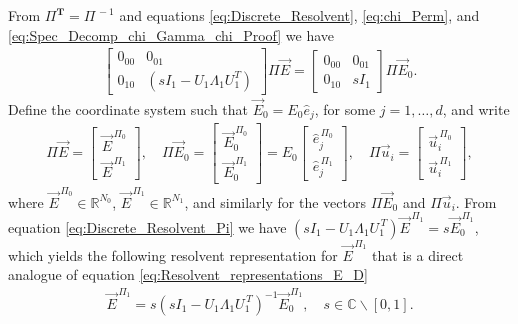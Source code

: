 \documentclass{cmslatex}
\newcommand{\T}{\mathbf{T}}
\begin{document}
From $\Pi^{\T}=\Pi^{\,-1}$ and equations \eqref{eq:Discrete_Resolvent},
\eqref{eq:chi_Perm}, and \eqref{eq:Spec_Decomp_chi_Gamma_chi_Proof} we
have 
%
\begin{align}\label{eq:Discrete_Resolvent_Pi}
  \left[
  \begin{array}{ccc}
    0_{00}&0_{01}\\
    0_{10}&(sI_1-U_1\Lambda_1U_1^T)
    \end{array}
\right]
\Pi\vec{E}
=
\left[
  \begin{array}{ccc}
    0_{00}&0_{01}\\
    0_{10}&sI_1
    \end{array}
\right]
\Pi\vec{E}_0.
\end{align}
%
Define the coordinate system such that $\vec{E}_0=E_0\hat{e}_j$, for
some $j=1,\ldots,d$, and write 
%
\begin{align}\label{Pi_coordinates_E}
  \Pi\vec{E}=
  \left[
  \begin{array}{ccc}
    \vec{E}^{\,\Pi_0}\\
    \vec{E}^{\,\Pi_1}
    \end{array}
\right],
\quad
 \Pi\vec{E}_0=
  \left[
  \begin{array}{ccc}
    \vec{E}_0^{\,\Pi_0}\\
    \vec{E}_0^{\,\Pi_1}
    \end{array}
\right]
=
E_0
\left[
  \begin{array}{ccc}
    \hat{e}_j^{\,\Pi_0}\\
    \hat{e}_j^{\,\Pi_1}
    \end{array}
\right],
\quad
 \Pi\vec{u}_i=
  \left[
  \begin{array}{ccc}
    \vec{u}_i^{\,\Pi_0}\\
    \vec{u}_i^{\,\Pi_1}
    \end{array}
\right],
\end{align}
%
where $\vec{E}^{\,\Pi_0}\in\mathbb{R}^{N_0}$,
$\vec{E}^{\,\Pi_1}\in\mathbb{R}^{N_1}$, and similarly for the vectors
$\Pi\vec{E}_0$ and $\Pi\vec{u}_i$. From equation
\eqref{eq:Discrete_Resolvent_Pi} we have
$(sI_1-U_1\Lambda_1U_1^{\,T})\vec{E}^{\,\Pi_1}=s\vec{E}_0^{\,\Pi_1}$, which
yields the following resolvent representation for $\vec{E}^{\,\Pi_1}$
that is a direct analogue of equation
\eqref{eq:Resolvent_representations_E_D} 
%
\begin{align}\label{eq:Resolvent_representations_E_Pi}
  \vec{E}^{\,\Pi_1}=s(sI_1-U_1\Lambda_1U_1^{\,T})^{-1}\vec{E}_0^{\,\Pi_1}, \quad
  s\in\mathbb{C}\backslash[0,1].
\end{align}
%
\end{document}
